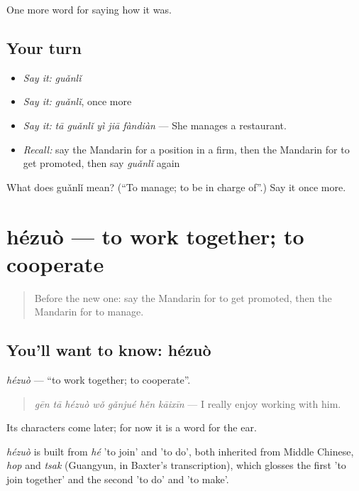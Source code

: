 \begin{grammarlens}[title={What you've built}]
One more word for saying how it was.
\end{grammarlens}

\subsection*{Your turn}
\begin{itemize}
\raggedright
  \item \emph{Say it:} \emph{guǎnlǐ}
  \item \emph{Say it:} \emph{guǎnlǐ}, once more
  \item \emph{Say it:} \emph{tā guǎnlǐ yì jiā fàndiàn} — She manages a restaurant.
  \item \emph{Recall:} say the Mandarin for a position in a firm, then the Mandarin for to get promoted, then say \emph{guǎnlǐ} again
\end{itemize}

\begin{tcolorbox}[breakable,colback=teal!4,colframe=teal!35!black,title={Before you move on}]
What does guǎnlǐ mean? (\textquotedblleft{}To manage; to be in charge of\textquotedblright{}.) Say it once more.
\end{tcolorbox}
\section[hézuò]{hézuò — to work together; to cooperate}

\label{lesson:ZH-C490-hezuo}



\begin{quote}
Before the new one: say the Mandarin for to get promoted, then the Mandarin for to manage.
\end{quote}

\subsection*{You'll want to know: hézuò}
\emph{hézuò} — \textquotedblleft{}to work together; to cooperate\textquotedblright{}.

\begin{quote}
\emph{gēn tā hézuò wǒ gǎnjué hěn kāixīn} — I really enjoy working with him.
\end{quote}

Its characters come later; for now it is a word for the ear.

\begin{cousinweb}
\emph{hézuò} is built from \emph{hé} 'to join' and  'to do', both inherited from Middle Chinese, \emph{hop} and \emph{tsak} (Guangyun, in Baxter's transcription), which glosses the first 'to join together' and the second 'to do' and 'to make'.
\end{cousinweb}

